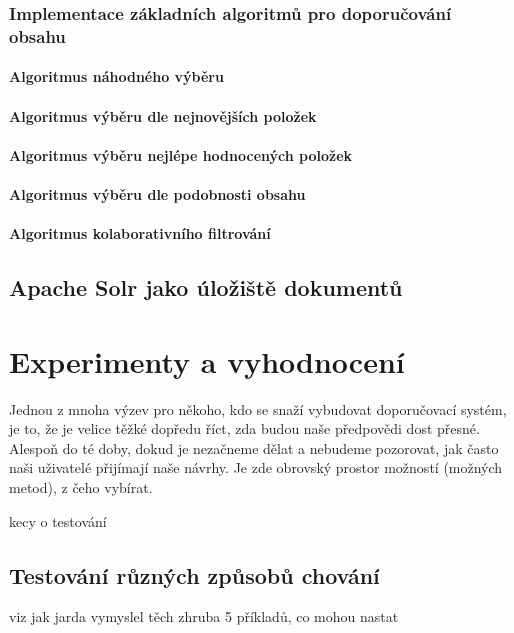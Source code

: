 \documentclass[thesis=M,czech]{FITthesis}[2014/05/07]
\begin{document}
\subsection{Implementace základních algoritmů pro doporučování obsahu}
\label{sec:alg}

\subsubsection{Algoritmus náhodného výběru}

\subsubsection{Algoritmus výběru dle nejnovějších položek}

\subsubsection{Algoritmus výběru nejlépe hodnocených položek}

\subsubsection{Algoritmus výběru dle podobnosti obsahu}

\subsubsection{Algoritmus kolaborativního filtrování}

\section{Apache Solr jako úložiště dokumentů}

\chapter{Experimenty a vyhodnocení}
\label{chap:tests}

Jednou z mnoha výzev pro někoho, kdo se snaží vybudovat doporučovací systém, je to, že je velice těžké dopředu říct, zda budou naše předpovědi dost přesné. Alespoň do té doby, dokud je nezačneme dělat a nebudeme pozorovat, jak často naši uživatelé přijímají naše návrhy. Je zde obrovský prostor možností (možných metod), z čeho vybírat. 

kecy o testování
\section{Testování různých způsobů chování}
viz jak jarda vymyslel těch zhruba 5 příkladů, co mohou nastat
\end{document}
